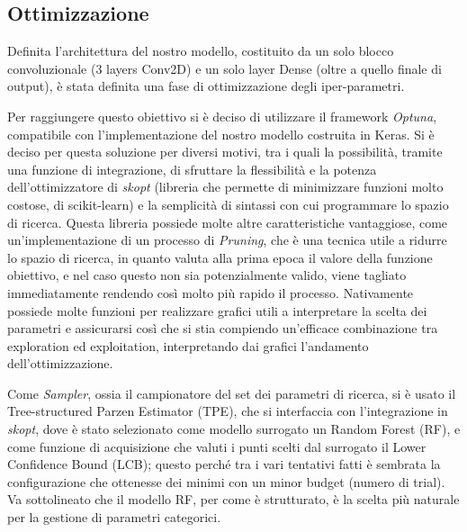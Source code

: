 \subsection{Ottimizzazione}

Definita l'architettura del nostro modello, costituito da un solo blocco convoluzionale (3 layers Conv2D) e un solo layer Dense (oltre a quello finale di output), è stata definita una fase di ottimizzazione degli iper-parametri.

Per raggiungere questo obiettivo si è deciso di utilizzare il framework \textit{Optuna}, compatibile con l'implementazione del nostro modello costruita in Keras. Si è deciso per questa soluzione per diversi motivi, tra i quali la possibilità, tramite una funzione di integrazione, di sfruttare la flessibilità e la potenza dell'ottimizzatore di \textit{skopt} (libreria che permette di minimizzare funzioni molto costose, di scikit-learn) e la semplicità di sintassi con cui programmare lo spazio di ricerca.
Questa libreria possiede molte altre caratteristiche vantaggiose, come un'implementazione di un processo di \textit{Pruning}, che è una tecnica utile a ridurre lo spazio di ricerca, in quanto valuta alla prima epoca il valore della funzione obiettivo, e nel caso questo non sia potenzialmente valido, viene tagliato immediatamente rendendo così molto più rapido il processo. 
Nativamente possiede molte funzioni per realizzare grafici utili a interpretare la scelta dei parametri e assicurarsi così che si stia compiendo un'efficace combinazione tra exploration ed exploitation, interpretando dai grafici l'andamento dell'ottimizzazione.

Come \textit{Sampler}, ossia il campionatore del set dei parametri di ricerca, si è usato il Tree-structured Parzen Estimator (TPE), che si interfaccia con l'integrazione in \textit{skopt}, dove è stato selezionato come modello surrogato un Random Forest (RF), e come funzione di acquisizione che valuti i punti scelti dal surrogato il Lower Confidence Bound (LCB); questo perché tra i vari tentativi fatti è sembrata la configurazione che ottenesse dei minimi con un minor budget (numero di trial). Va sottolineato che il modello RF, per come è strutturato, è la scelta più naturale per la gestione di parametri categorici.

